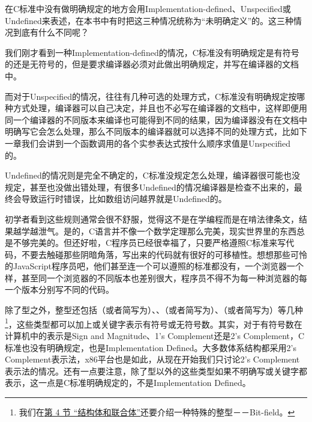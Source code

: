 \begin{BookNote}


在C标准中没有做明确规定的地方会用Implementation-defined、Unspecified或Undefined来表述，在本书中有时把这三种情况统称为“未明确定义”的。这三种情况到底有什么不同呢？



我们刚才看到一种Implementation-defined的情况，C标准没有明确规定是有符号的还是无符号的，但是要求编译器必须对此做出明确规定，并写在编译器的文档中。



而对于Unspecified的情况，往往有几种可选的处理方式，C标准没有明确规定按哪种方式处理，编译器可以自己决定，并且也不必写在编译器的文档中，这样即便用同一个编译器的不同版本来编译也可能得到不同的结果，因为编译器没有在文档中明确写它会怎么处理，那么不同版本的编译器就可以选择不同的处理方式，比如下一章我们会讲到一个函数调用的各个实参表达式按什么顺序求值是Unspecified的。



Undefined的情况则是完全不确定的，C标准没规定怎么处理，编译器很可能也没规定，甚至也没做出错处理，有很多Undefined的情况编译器是检查不出来的，最终会导致运行时错误，比如数组访问越界就是Undefined的。



初学者看到这些规则通常会很不舒服，觉得这不是在学编程而是在啃法律条文，结果越学越泄气。是的，C语言并不像一个数学定理那么完美，现实世界里的东西总是不够完美的。但还好啦，C程序员已经很幸福了，只要严格遵照C标准来写代码，不要去触碰那些阴暗角落，写出来的代码就有很好的可移植性。想想那些可怜的JavaScript程序员吧，他们甚至连一个可以遵照的标准都没有，一个浏览器一个样，甚至同一个浏览器的不同版本也差别很大，程序员不得不为每一种浏览器的每一个版本分别写不同的代码。

\end{BookNote}


除了型之外，整型还包括（或者简写为）、、（或者简写为）、（或者简写为）等几种\footnote[25]{我们在\hyperlink{db.ch19s04.id2779313}{第 4 节 “结构体和联合体”}还要介绍一种特殊的整型－－Bit-field。}，这些类型都可以加上或关键字表示有符号或无符号数。其实，对于有符号数在计算机中的表示是Sign and Magnitude、1's Complement还是2's Complement，C标准也没有明确规定，也是Implementation Defined。大多数体系结构都采用2's Complement表示法，x86平台也是如此，从现在开始我们只讨论2's Complement表示法的情况。还有一点要注意，除了型以外的这些类型如果不明确写或关键字都表示，这一点是C标准明确规定的，不是Implementation Defined。



